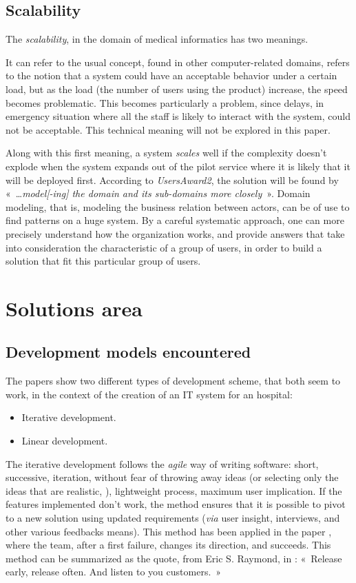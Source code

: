 \documentclass[a4paper,10pt]{article}
\begin{document}
\begin{multicols}{2}
\subsection{Scalability}

The \emph{scalability}, in the domain of medical informatics has two meanings.

It can refer to the usual concept, found in other computer-related domains,
refers to the notion that a system could have an acceptable behavior under a
certain load, but as the load (the number of users using the product) increase,
the speed becomes problematic.  This becomes particularly a problem, since
delays, in emergency situation where all the staff is likely to interact with
the system, could not be acceptable. This technical meaning will not be explored
in this paper.

Along with this first meaning, a system \emph{scales} well if the complexity doesn't
explode when the system expands out of the pilot service where it is likely that
it will be deployed first. According to \emph{UsersAward2}, the solution will be
found by «~…\emph{model[-ing] the domain and its sub-domains more closely~}».
Domain modeling, that is, modeling the business relation between actors, can be
of use to find patterns on a huge system. By a careful systematic approach, one
can more precisely understand how the organization works, and provide answers
that take into consideration the characteristic of a group of users, in order to
build a solution that fit this particular group of users.

\section{Solutions area}

\subsection{Development models encountered}

The papers show two different types of development scheme, that both seem to
work, in the context of the creation of an IT system for an hospital:
\begin{itemize}
\item Iterative development.
\item Linear development.
\end{itemize}

The iterative development follows the \emph{agile} way of writing software:
short, successive, iteration, without fear of throwing away ideas (or selecting only
the ideas that are realistic, \cite{Hasvold2011}), lightweight
process, maximum user implication. If the features implemented don't work, the
method ensures that it is possible to pivot to a new solution using updated
requirements (\emph{via} user insight, interviews, and other various feedbacks
means). This method has been applied in the paper \cite{Hasvold2011}, where the
team, after a first failure, changes its direction, and succeeds. This method
can be summarized as the quote, from Eric S. Raymond, in \cite{Raymond97} :
«~Release early, release often. And listen to you customers.~»


\end{multicols}
\end{document}

